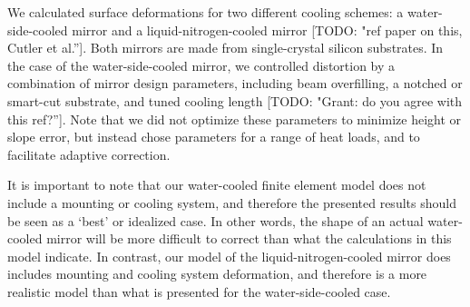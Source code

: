 \documentclass[preprint]{iucr}
\newcommand{\todo}[1]{{\color{red}[TODO: "#1'']}}
\begin{document}
We calculated surface deformations for two different cooling schemes: a water-side-cooled mirror and a liquid-nitrogen-cooled mirror \todo{ref paper on this, Cutler et al.}. Both mirrors are made from single-crystal silicon substrates. In the case of the water-side-cooled mirror, we controlled distortion by a combination of mirror design parameters, including beam overfilling, a notched or smart-cut substrate, and tuned cooling length \cite{Zhang} \todo{Grant: do you agree with this ref?}.  Note that we did not optimize these parameters to minimize height or slope error, but instead chose parameters for a range of heat loads, and to facilitate adaptive correction.

It is important to note that our water-cooled finite element model does not include a mounting or cooling system, and therefore the presented results should be seen as a `best' or idealized case.  In other words, the shape of an actual water-cooled mirror will be more difficult to correct than what the calculations in this model indicate. In contrast, our model of the liquid-nitrogen-cooled mirror does includes mounting and cooling system deformation, and therefore is a more realistic model than what is presented for the water-side-cooled case.
\end{document}
